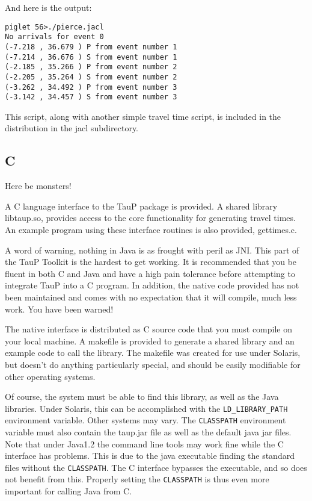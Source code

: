 And here is the output:
\begin{verbatim}
piglet 56>./pierce.jacl
No arrivals for event 0
(-7.218 , 36.679 ) P from event number 1
(-7.214 , 36.676 ) S from event number 1
(-2.185 , 35.266 ) P from event number 2
(-2.205 , 35.264 ) S from event number 2
(-3.262 , 34.492 ) P from event number 3
(-3.142 , 34.457 ) S from event number 3
\end{verbatim}

This script, along with another simple travel time script, is included in the
distribution in the jacl subdirectory.


\subsection{C}

Here be monsters!

A C language interface to the TauP package is provided. A shared library
libtaup.so, provides access to the core functionality for generating travel
times. An example program using these interface routines is also provided,
gettimes.c.

A word of warning, nothing in Java is as frought with peril as JNI. This part of the TauP Toolkit is the hardest to get working. It is recommended that you be
fluent in both C and Java and have a high pain tolerance before attempting to
integrate TauP into a C program. In addition, the native code provided has not
been maintained and comes with no expectation that it will compile, much less work.
 You have been warned!


The native interface is distributed as C source code that you must compile
on your local machine. A makefile is provided to generate a shared library
and an example code to call the library. The makefile was created for use under
Solaris, but doesn't do anything particularly special, and should be
easily modifiable for other operating systems.

Of course, the system must be able to find this library, as well as the
Java libraries. Under Solaris, this can be accomplished with the
\texttt{LD\_LIBRARY\_PATH} environment variable. Other systems may vary.
The \texttt{CLASSPATH}  environment variable must also contain the taup.jar
file as well as the default java jar files. Note that under Java1.2 the command
line tools may work fine while the C interface has problems. This is due to
the java executable finding the standard files without the \texttt{CLASSPATH}.
The C interface bypasses the executable, and so does not benefit from this.
Properly setting the \texttt{CLASSPATH} is thus even more important for calling
Java from C.

